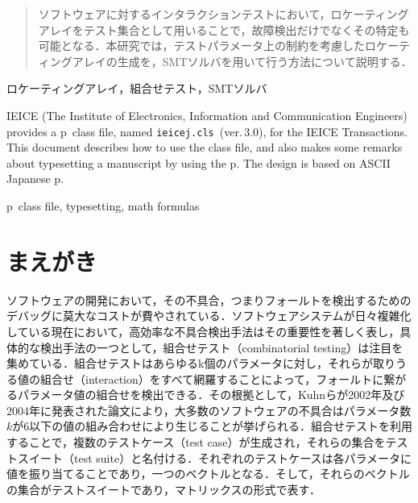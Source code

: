\documentclass[paper]{ieicej}
\def\IEICEJcls{\texttt{ieicej.cls}}
\def\IEICEJver{3.0}
\begin{document}
\makeatletter
\if@letter
\makeatother
\maketitle
\fi
\begin{abstract}
ソフトウェアに対するインタラクションテストにおいて，ロケーティングアレイをテスト集合として用いることで，故障検出だけでなくその特定も可能となる．本研究では，テストパラメータ上の制約を考慮したロケーティングアレイの生成を，SMTソルバを用いて行う方法について説明する．
\end{abstract}
\begin{keyword}
ロケーティングアレイ，組合せテスト，SMTソルバ
\end{keyword}
\begin{eabstract}
IEICE (The Institute of Electronics, Information and Communication Engineers)
provides a p\LaTeXe\ class file, named \IEICEJcls\ (ver.\,\IEICEJver),
for the IEICE Transactions. This document describes how to use
the class file, and also makes some remarks about typesetting
a manuscript by using the p\LaTeXe.
The design is based on ASCII Japanese p\LaTeXe.
\end{eabstract}
\begin{ekeyword}
p\LaTeXe\ class file, typesetting, math formulas
\end{ekeyword}
\makeatletter
\if@letter
\makeatother
\else
 \maketitle
\fi

\section{まえがき}
\label{sec:intro}
ソフトウェアの開発において，その不具合，つまりフォールトを検出するためのデバッグに莫大なコストが費やされている．ソフトウェアシステムが日々複雑化している現在において，高効率な不具合検出手法はその重要性を著しく表し，具体的な検出手法の一つとして，組合せテスト（combinatorial testing）は注目を集めている．組合せテストはあらゆるk個のパラメータに対し，それらが取りうる値の組合せ（interaction）をすべて網羅することによって，フォールトに繋がるパラメータ値の組合せを検出できる．その根拠として，Kuhnらが2002年\cite{kuhn2002}及び2004年\cite{kuhn2004}に発表された論文により，大多数のソフトウェアの不具合はパラメータ数$k$が6以下の値の組み合わせにより生じることが挙げられる．組合せテストを利用することで，複数のテストケース（test case）が生成され，それらの集合をテストスイート（test suite）と名付ける．それぞれのテストケースは各パラメータに値を振り当てることであり，一つのベクトルとなる．そして，それらのベクトルの集合がテストスイートであり，マトリックスの形式で表す．
\end{document}
